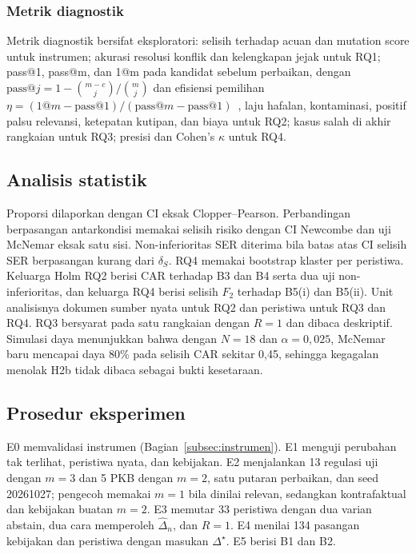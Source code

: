 \documentclass[journal,a4paper]{IEEEtran}
\makeatletter
\DeclareRobustCommand{\en}[1]{{\usefont{\f@encoding}{\f@family}{\f@series}{it}#1\/}}
\newcommand{\emas}{\star}
\makeatother
\begin{document}
\subsubsection{Metrik diagnostik}
Metrik diagnostik bersifat eksploratori: selisih terhadap acuan dan \en{mutation score} untuk instrumen; akurasi resolusi konflik dan kelengkapan jejak untuk RQ1; \en{pass@1}, \en{pass@m}, dan \en{1@m} pada kandidat sebelum perbaikan, dengan $\text{pass@}j = 1-\binom{m-c}{j}/\binom{m}{j}$ dan efisiensi pemilihan $\eta = (\text{1@}m - \text{pass@}1)/(\text{pass@}m - \text{pass@}1)$~\cite{li2022alphacode}, laju hafalan, kontaminasi, positif palsu relevansi, ketepatan kutipan, dan biaya untuk RQ2; kasus salah di akhir rangkaian untuk RQ3; presisi dan Cohen's $\kappa$ untuk RQ4.

\subsection{Analisis statistik}
\label{subsec:statistik}
Proporsi dilaporkan dengan CI eksak Clopper--Pearson. Perbandingan berpasangan antarkondisi memakai selisih risiko dengan CI Newcombe dan uji McNemar eksak satu sisi. Non-inferioritas SER diterima bila batas atas CI selisih SER berpasangan kurang dari $\delta_S$. RQ4 memakai \en{bootstrap} klaster per peristiwa. Keluarga Holm RQ2 berisi CAR terhadap B3 dan B4 serta dua uji non-inferioritas, dan keluarga RQ4 berisi selisih $F_2$ terhadap B5(i) dan B5(ii). Unit analisisnya dokumen sumber nyata untuk RQ2 dan peristiwa untuk RQ3 dan RQ4. RQ3 bersyarat pada satu rangkaian dengan $R = 1$ dan dibaca deskriptif. Simulasi daya menunjukkan bahwa dengan $N = 18$ dan $\alpha = 0{,}025$, McNemar baru mencapai daya 80\% pada selisih CAR sekitar 0,45, sehingga kegagalan menolak H2b tidak dibaca sebagai bukti kesetaraan.

\subsection{Prosedur eksperimen}
E0 memvalidasi instrumen (Bagian~\ref{subsec:instrumen}). E1 menguji perubahan tak terlihat, peristiwa nyata, dan kebijakan. E2 menjalankan 13 regulasi uji dengan $m = 3$ dan 5 PKB dengan $m = 2$, satu putaran perbaikan, dan \en{seed} 20261027; pengecoh memakai $m = 1$ bila dinilai relevan, sedangkan kontrafaktual dan kebijakan buatan $m = 2$. E3 memutar 33 peristiwa dengan dua varian \en{abstain}, dua cara memperoleh $\hat{\Delta}_n$, dan $R = 1$. E4 menilai 134 pasangan kebijakan dan peristiwa dengan masukan $\Delta^{\emas}$. E5 berisi B1 dan B2.
\end{document}
